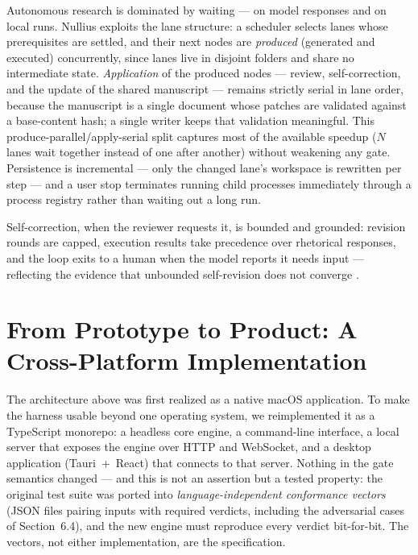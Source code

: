\documentclass[11pt]{article}
\begin{document}
Autonomous research is dominated by waiting --- on model responses and on local runs. Nullius exploits the lane structure: a scheduler selects lanes whose prerequisites are settled, and their next nodes are \emph{produced} (generated and executed) concurrently, since lanes live in disjoint folders and share no intermediate state. \emph{Application} of the produced nodes --- review, self-correction, and the update of the shared manuscript --- remains strictly serial in lane order, because the manuscript is a single document whose patches are validated against a base-content hash; a single writer keeps that validation meaningful. This produce-parallel/apply-serial split captures most of the available speedup ($N$ lanes wait together instead of one after another) without weakening any gate. Persistence is incremental --- only the changed lane's workspace is rewritten per step --- and a user stop terminates running child processes immediately through a process registry rather than waiting out a long run.

Self-correction, when the reviewer requests it, is bounded and grounded: revision rounds are capped, execution results take precedence over rhetorical responses, and the loop exits to a human when the model reports it needs input --- reflecting the evidence that unbounded self-revision does not converge \cite{huang2024}.


\section{From Prototype to Product: A Cross-Platform Implementation}
\label{sec:implementation}

The architecture above was first realized as a native macOS application. To make the harness usable beyond one operating system, we reimplemented it as a TypeScript monorepo: a headless core engine, a command-line interface, a local server that exposes the engine over HTTP and WebSocket, and a desktop application (Tauri~+~React) that connects to that server. Nothing in the gate semantics changed --- and this is not an assertion but a tested property: the original test suite was ported into \emph{language-independent conformance vectors} (JSON files pairing inputs with required verdicts, including the adversarial cases of Section~6.4), and the new engine must reproduce every verdict bit-for-bit. The vectors, not either implementation, are the specification.
\end{document}
